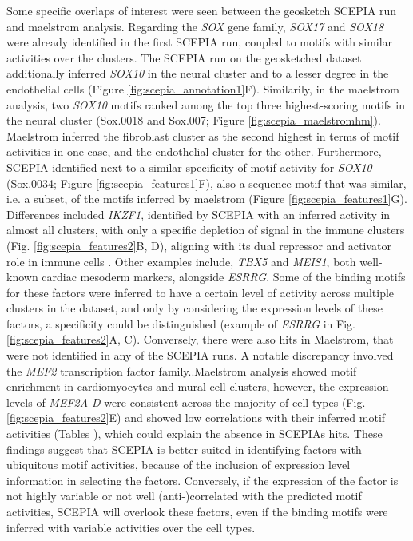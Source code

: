 Some specific overlaps of interest were seen between the geosketch SCEPIA run and maelstrom analysis. Regarding the \textit{SOX} gene family, \textit{SOX17} and \textit{SOX18} were already identified in the first SCEPIA run, coupled to motifs with similar activities over the clusters. The SCEPIA run on the geosketched dataset additionally inferred \textit{SOX10} in the neural cluster and to a lesser degree in the endothelial cells (Figure \ref{fig:scepia_annotation1}F). Similarily, in the maelstrom analysis, two \textit{SOX10} motifs ranked among the top three highest-scoring motifs in the neural cluster (Sox.0018 and Sox.007; Figure \ref{fig:scepia_maelstromhm}). Maelstrom inferred the fibroblast cluster as the second highest in terms of motif activities in one case, and the endothelial cluster for the other. Furthermore, SCEPIA identified next to a similar specificity of motif activity for \textit{SOX10} (Sox.0034; Figure \ref{fig:scepia_features1}F), also a sequence motif that was similar, i.e. a subset, of the motifs inferred by maelstrom (Figure \ref{fig:scepia_features1}G). Differences included \textit{IKZF1}, identified by SCEPIA with an inferred activity in almost all clusters, with only a specific depletion of signal in the immune clusters (Fig. \ref{fig:scepia_features2}B, D), aligning with its dual repressor and activator role in immune cells \cite{Marke2018}. Other examples include, \textit{TBX5} and \textit{MEIS1}, both well-known cardiac mesoderm markers, alongside \textit{ESRRG}. Some of the binding motifs for these factors were inferred to have a certain level of activity across multiple clusters in the dataset, and only by considering the expression levels of these factors, a specificity could be distinguished (example of \textit{ESRRG} in Fig. \ref{fig:scepia_features2}A, C). Conversely, there were also hits in Maelstrom, that were not identified in any of the SCEPIA runs. A notable discrepancy involved the \textit{MEF2} transcription factor family..Maelstrom analysis showed motif enrichment in cardiomyocytes and mural cell clusters, however, the expression levels of \textit{MEF2A-D} were consistent across the majority of cell types (Fig. \ref{fig:scepia_features2}E) and showed low correlations with their inferred motif activities (Tables \cite{tab:corrtable_SCEPIA,tab:corrtable_GeoSCEPIA}), which could explain the absence in SCEPIAs hits. These findings suggest that SCEPIA is better suited in identifying factors with ubiquitous motif activities, because of the inclusion of expression level information in selecting the factors. Conversely, if the expression of the factor is not highly variable or not well (anti-)correlated with the predicted motif activities, SCEPIA will overlook these factors, even if the binding motifs were inferred with variable activities over the cell types.

